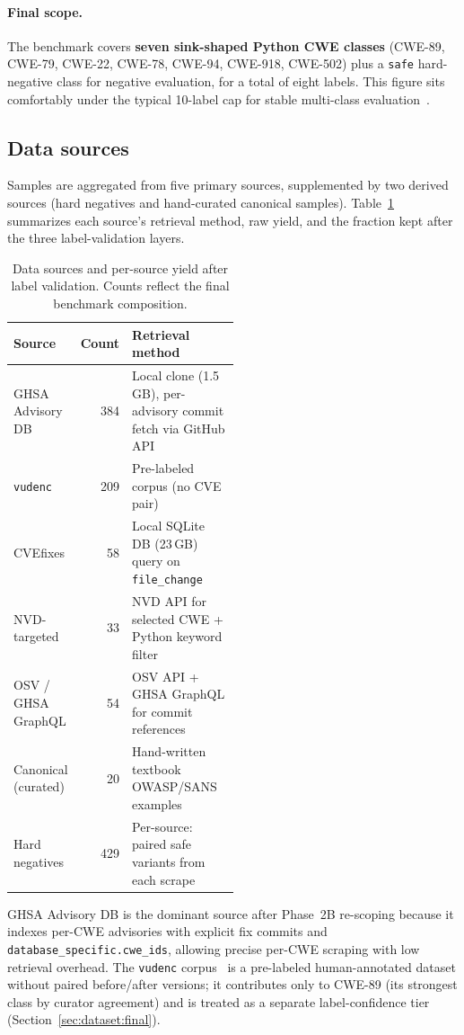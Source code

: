 \paragraph{Final scope.}
The benchmark covers \textbf{seven sink-shaped Python CWE classes}
(CWE-89, CWE-79, CWE-22, CWE-78, CWE-94, CWE-918, CWE-502) plus a
\texttt{safe} hard-negative class for negative evaluation, for a
total of eight labels. This figure sits comfortably under the
typical 10-label cap for stable multi-class
evaluation~\cite{sokolova2009}.

\subsection{Data sources}
\label{sec:dataset:sources}

Samples are aggregated from five primary sources, supplemented by
two derived sources (hard negatives and hand-curated canonical
samples). Table~\ref{tab:sources} summarizes each source's
retrieval method, raw yield, and the fraction kept after the
three label-validation layers.

\begin{table}[h]
\centering
\caption{Data sources and per-source yield after label validation.
Counts reflect the final benchmark composition.}
\label{tab:sources}
\begin{tabular}{lrp{0.5\linewidth}}
\toprule
\textbf{Source} & \textbf{Count} & \textbf{Retrieval method} \\
\midrule
GHSA Advisory DB    & 384 & Local clone (1.5\,GB), per-advisory commit fetch via GitHub API \\
\texttt{vudenc}     & 209 & Pre-labeled corpus (no CVE pair) \\
CVEfixes            &  58 & Local SQLite DB (23\,GB) query on \texttt{file\_change} \\
NVD-targeted        &  33 & NVD API for selected CWE + Python keyword filter \\
OSV / GHSA GraphQL  &  54 & OSV API + GHSA GraphQL for commit references \\
Canonical (curated) &  20 & Hand-written textbook OWASP/SANS examples \\
\addlinespace
Hard negatives      & 429 & Per-source: paired safe variants from each scrape \\
\bottomrule
\end{tabular}
\end{table}

GHSA Advisory DB is the dominant source after Phase~2B re-scoping
because it indexes per-CWE advisories with explicit fix commits and
\texttt{database\_specific.cwe\_ids}, allowing precise per-CWE
scraping with low retrieval overhead. The \texttt{vudenc}
corpus~\cite{vudenc} is a pre-labeled human-annotated dataset
without paired before/after versions; it contributes only to CWE-89
(its strongest class by curator agreement) and is treated as a
separate label-confidence tier (Section~\ref{sec:dataset:final}).

